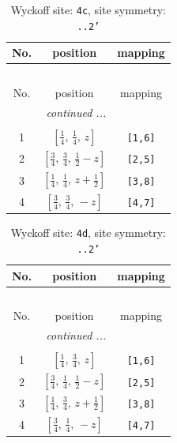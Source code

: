 \documentclass[fleqn,8pt]{jsarticle}
\begin{document}
\renewcommand{\arraystretch}{1.2}
\begin{longtable}{ccc}
\caption{Wyckoff site: {\tt 4c}, site symmetry: {\tt ..2'}}
 \\
 \hline \hline
No. & position & mapping \\ \hline \endfirsthead

\multicolumn{2}{l}{\tablename\ \thetable{}} \\
 \hline \hline
No. & position & mapping \\ \hline \endhead

 \hline \hline
\multicolumn{2}{r}{\footnotesize\it continued ...} \\ \endfoot

 \hline \hline
\multicolumn{2}{r}{} \\ \endlastfoot

1 & $\left[ \frac{1}{4},\, \frac{1}{4},\, z \right]$ & {\tt [1,6]} \\ \hline
2 & $\left[ \frac{3}{4},\, \frac{3}{4},\, \frac{1}{2} - z \right]$ & {\tt [2,5]} \\ \hline
3 & $\left[ \frac{1}{4},\, \frac{1}{4},\, z + \frac{1}{2} \right]$ & {\tt [3,8]} \\ \hline
4 & $\left[ \frac{3}{4},\, \frac{3}{4},\, - z \right]$ & {\tt [4,7]} \\
\end{longtable}
\renewcommand{\arraystretch}{1.2}
\begin{longtable}{ccc}
\caption{Wyckoff site: {\tt 4d}, site symmetry: {\tt ..2'}}
 \\
 \hline \hline
No. & position & mapping \\ \hline \endfirsthead

\multicolumn{2}{l}{\tablename\ \thetable{}} \\
 \hline \hline
No. & position & mapping \\ \hline \endhead

 \hline \hline
\multicolumn{2}{r}{\footnotesize\it continued ...} \\ \endfoot

 \hline \hline
\multicolumn{2}{r}{} \\ \endlastfoot

1 & $\left[ \frac{1}{4},\, \frac{3}{4},\, z \right]$ & {\tt [1,6]} \\ \hline
2 & $\left[ \frac{3}{4},\, \frac{1}{4},\, \frac{1}{2} - z \right]$ & {\tt [2,5]} \\ \hline
3 & $\left[ \frac{1}{4},\, \frac{3}{4},\, z + \frac{1}{2} \right]$ & {\tt [3,8]} \\ \hline
4 & $\left[ \frac{3}{4},\, \frac{1}{4},\, - z \right]$ & {\tt [4,7]} \\
\end{longtable}
\end{document}
